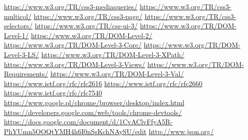 \documentclass[polish, twoside, 12pt]{mwart}
\begin{document}
\begin{thebibliography}{11}
    \url{https://www.w3.org/TR/css3-mediaqueries/}
    \url{https://www.w3.org/TR/css3-multicol/}
    \url{https://www.w3.org/TR/css3-page/}
    \url{https://www.w3.org/TR/css3-selectors/}
    \url{https://www.w3.org/TR/css-ui-3/}
    \url{https://www.w3.org/TR/DOM-Level-1/}
    \url{https://www.w3.org/TR/DOM-Level-2/}
    \url{https://www.w3.org/TR/DOM-Level-3-Core/}
    \url{https://www.w3.org/TR/DOM-Level-3-LS/}
    \url{https://www.w3.org/TR/DOM-Level-3-XPath/}
    \url{https://www.w3.org/TR/DOM-Level-3-Views/}
    \url{https://www.w3.org/TR/DOM-Requirements/}
    \url{https://www.w3.org/TR/DOM-Level-3-Val/}
    \url{https://www.ietf.org/rfc/rfc2616}
    \url{https://www.ietf.org/rfc/rfc2660}
    \url{https://www.ietf.org/rfc/rfc7540}
    \url{https://www.google.pl/chrome/browser/desktop/index.html}
    \url{https://developers.google.com/web/tools/chrome-devtools/}
    \url{https://docs.google.com/document/d/1CvAClvFfyA5R-PhYUmn5OOQtYMH4h6I0nSsKchNAySU/edit}
    \url{http://www.json.org/}
\end{thebibliography}
\end{document}
